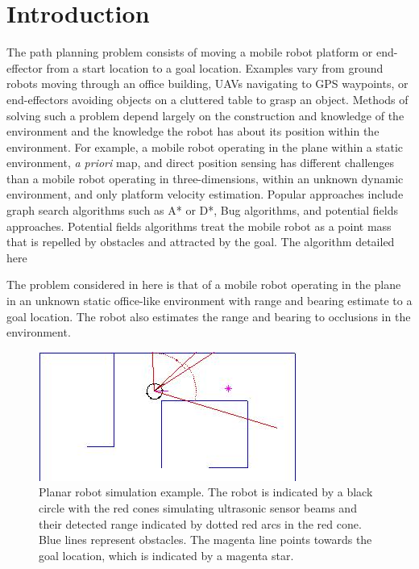 \chapter{Introduction}

The path planning problem consists of moving a mobile robot platform or end-effector from a start location to a goal location.
Examples vary from ground robots moving through an office building, UAVs navigating to GPS waypoints, or end-effectors avoiding objects on a cluttered table to grasp an object.
Methods of solving such a problem depend largely on the construction and knowledge of the environment and the knowledge the robot has about its position within the environment. For example, a mobile robot operating in the plane within a static environment, \textit{a priori} map, and direct position sensing has different challenges than a mobile robot operating in three-dimensions, within an unknown dynamic environment, and only platform velocity estimation.
Popular approaches include graph search algorithms such as A* or D*, Bug algorithms, and potential fields approaches. Potential fields algorithms treat the mobile robot as a point mass that is repelled by obstacles and attracted by the goal. The algorithm detailed here 

The problem considered in here is that of a mobile robot operating in the plane in an unknown static office-like environment with range and bearing estimate to a goal location. The robot also estimates the range and bearing to occlusions in the environment.

\begin{figure}[h]
	\centering
	\includegraphics{sim_fig1.jpg}
	\caption[Planar robot simulation example.]
	{Planar robot simulation example. The robot is indicated by a black circle with the red cones simulating ultrasonic sensor beams and their detected range indicated by dotted red arcs in the red cone. Blue lines represent obstacles. The magenta line points towards the goal location, which is indicated by a magenta star.}
	\label{fig:simFig1}
\end{figure}





